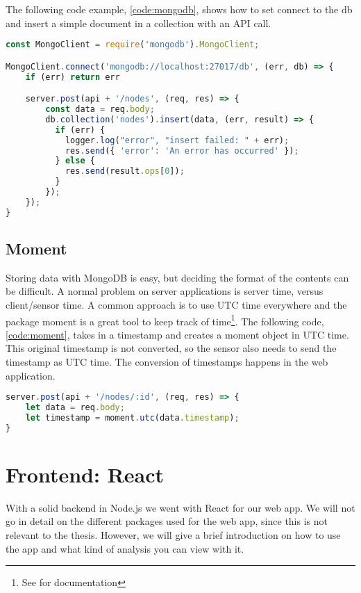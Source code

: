 \documentclass[USenglish]{ifimaster}  %
\begin{document}
The following code example, \vref{code:mongodb}, shows how to set connect to the db and insert a simple document in a collection with an API call.

\begin{lstlisting}[caption={MongoDB setup and insertion},label={code:mongodb},language=JavaScript]
const MongoClient = require('mongodb').MongoClient;

MongoClient.connect('mongodb://localhost:27017/db', (err, db) => {
    if (err) return err

    server.post(api + '/nodes', (req, res) => {
        const data = req.body;
        db.collection('nodes').insert(data, (err, result) => {
          if (err) {
            logger.log("error", "insert failed: " + err);
            res.send({ 'error': 'An error has occurred' });
          } else {
            res.send(result.ops[0]);
          }
        });
    });
}
\end{lstlisting}

\subsection{Moment}
Storing data with MongoDB is easy, but deciding the format of the contents can be difficult. A normal problem on server applications is server time, versus client/sensor time. A common approach is to use UTC time everywhere and the package moment is a great tool to keep track of time\footnote{See \cite{npm:moment} for documentation}. The following code, \vref{code:moment}, takes in a timestamp and creates a moment object in UTC time. This original timestamp is not converted, so the sensor also needs to send the timestamp as UTC time. The conversion of timestamps happens in the web application.

\begin{lstlisting}[caption={Simple moment example},label={code:moment},language=JavaScript]
server.post(api + '/nodes/:id', (req, res) => {
    let data = req.body;
    let timestamp = moment.utc(data.timestamp);
}
\end{lstlisting}

\section{Frontend: React}
With a solid backend in Node.js we went with React for our web app. We will not go in detail on the different packages used for the web app, since this is not relevant to the thesis. However, we will give a brief introduction on how to use the app and what kind of analysis you can view with it.
\end{document}
